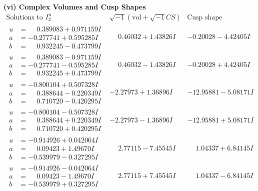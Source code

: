 \documentclass[1p]{elsarticle_modified}
\theoremstyle{definition}
\newcommand{\I}{\sqrt{-1}}
\begin{document}
\newpage\flushleft \textbf{(vi) Complex Volumes and Cusp Shapes}
$$\begin{array}{c|c|c}  
\text{Solutions to }I^u_{2}& \I (\text{vol} + \sqrt{-1}CS) & \text{Cusp shape}\\
 \hline 
\begin{aligned}
u &= \phantom{-}0.389083 + 0.971159 I \\
a &= -0.277741 + 0.595285 I \\
b &= \phantom{-}0.932245 - 0.473799 I\end{aligned}
 & \phantom{-}0.46032 + 1.43826 I & -0.20028 - 4.42405 I \\ \hline\begin{aligned}
u &= \phantom{-}0.389083 - 0.971159 I \\
a &= -0.277741 - 0.595285 I \\
b &= \phantom{-}0.932245 + 0.473799 I\end{aligned}
 & \phantom{-}0.46032 - 1.43826 I & -0.20028 + 4.42405 I \\ \hline\begin{aligned}
u &= -0.800104 + 0.507328 I \\
a &= \phantom{-}0.388644 - 0.220349 I \\
b &= \phantom{-}0.710720 - 0.420295 I\end{aligned}
 & -2.27973 + 1.36896 I & -12.95881 - 5.08171 I \\ \hline\begin{aligned}
u &= -0.800104 - 0.507328 I \\
a &= \phantom{-}0.388644 + 0.220349 I \\
b &= \phantom{-}0.710720 + 0.420295 I\end{aligned}
 & -2.27973 - 1.36896 I & -12.95881 + 5.08171 I \\ \hline\begin{aligned}
u &= -0.914926 + 0.042064 I \\
a &= \phantom{-}0.09423 + 1.49670 I \\
b &= -0.539979 - 0.327295 I\end{aligned}
 & \phantom{-}2.77115 - 7.45545 I & \phantom{-}1.04337 + 6.84145 I \\ \hline\begin{aligned}
u &= -0.914926 - 0.042064 I \\
a &= \phantom{-}0.09423 - 1.49670 I \\
b &= -0.539979 + 0.327295 I\end{aligned}
 & \phantom{-}2.77115 + 7.45545 I & \phantom{-}1.04337 - 6.84145 I \\ \hline\begin{aligned}

\end{aligned}
\end{array}$$
\end{document}
